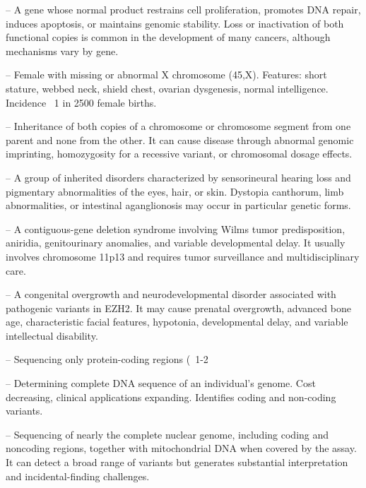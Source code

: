 -- A gene whose normal product restrains cell proliferation, promotes DNA repair, induces apoptosis, or maintains genomic stability. Loss or inactivation of both functional copies is common in the development of many cancers, although mechanisms vary by gene.

-- Female with missing or abnormal X chromosome (45,X). Features: short stature, webbed neck, shield chest, ovarian dysgenesis, normal intelligence. Incidence ~1 in 2500 female births.

-- Inheritance of both copies of a chromosome or chromosome segment from one parent and none from the other. It can cause disease through abnormal genomic imprinting, homozygosity for a recessive variant, or chromosomal dosage effects.

-- A group of inherited disorders characterized by sensorineural hearing loss and pigmentary abnormalities of the eyes, hair, or skin. Dystopia canthorum, limb abnormalities, or intestinal aganglionosis may occur in particular genetic forms.

-- A contiguous-gene deletion syndrome involving Wilms tumor predisposition, aniridia, genitourinary anomalies, and variable developmental delay. It usually involves chromosome 11p13 and requires tumor surveillance and multidisciplinary care.

-- A congenital overgrowth and neurodevelopmental disorder associated with pathogenic variants in EZH2. It may cause prenatal overgrowth, advanced bone age, characteristic facial features, hypotonia, developmental delay, and variable intellectual disability.

-- Sequencing only protein-coding regions (~1-2%

-- Determining complete DNA sequence of an individual's genome. Cost decreasing, clinical applications expanding. Identifies coding and non-coding variants.

-- Sequencing of nearly the complete nuclear genome, including coding and noncoding regions, together with mitochondrial DNA when covered by the assay. It can detect a broad range of variants but generates substantial interpretation and incidental-finding challenges.

